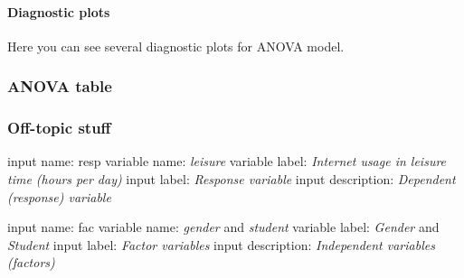 \documentclass{article}
\begin{document}
\paragraph{Diagnostic plots}

Here you can see several diagnostic plots for ANOVA model.

\subsubsection{ANOVA table}

\subsubsection{Off-topic stuff}

input name: resp variable name: \emph{leisure} variable label:
\emph{Internet usage in leisure time (hours per day)} input label:
\emph{Response variable} input description: \emph{Dependent (response)
variable}

input name: fac variable name: \emph{gender} and \emph{student} variable
label: \emph{Gender} and \emph{Student} input label: \emph{Factor
variables} input description: \emph{Independent variables (factors)}
\end{document}
